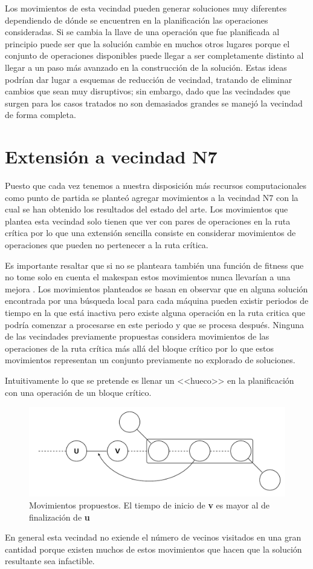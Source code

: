 Los movimientos de esta vecindad pueden generar soluciones muy diferentes dependiendo de dónde se encuentren en la planificación las operaciones consideradas. 
%
Si se cambia la llave de una operación que fue planificada al principio puede ser que la solución cambie en muchos otros lugares porque el conjunto de operaciones 
disponibles puede llegar a ser completamente distinto al llegar a un paso más avanzado en la construcción de la solución. 
%
Estas ideas podrían dar lugar a esquemas de reducción de vecindad, tratando de eliminar cambios que sean muy disruptivos;
%
sin embargo, dado que las vecindades que surgen para los casos tratados no son demasiados grandes se manejó la vecindad de forma completa.

\section{Extensión a vecindad N7}

Puesto que cada vez tenemos a nuestra disposición más recursos computacionales como punto de partida se planteó agregar movimientos a la vecindad N7 
con la cual se han obtenido los resultados del estado del arte.
%
Los movimientos que plantea esta vecindad solo tienen que ver con pares de operaciones en la ruta crítica por lo que una extensión sencilla consiste en 
considerar movimientos de operaciones que pueden no pertenecer a la ruta crítica. 

Es importante resaltar que si no se planteara también una función de fitness que no tome solo en cuenta el makespan estos movimientos nunca llevarían 
a una mejora \cite{blazewicz1996job}.
%
Los movimientos planteados se basan en observar que en alguna solución encontrada por una búsqueda local para cada máquina pueden existir periodos de tiempo en la 
que está inactiva pero existe alguna operación en la ruta critica que podría comenzar a procesarse en este periodo y que se procesa después. 
%
Ninguna de las vecindades previamente propuestas considera movimientos de las operaciones de la ruta crítica más allá del bloque crítico por lo que estos movimientos 
representan un conjunto previamente no explorado de soluciones.

Intuitivamente lo que se pretende es llenar un <<hueco>> en la planificación con una operación de un bloque crítico.

\begin{figure}[H]
\centering
\includegraphics[scale=.7]{Imagenes/N8.pdf}
    \caption{Movimientos propuestos. El tiempo de inicio de \textbf{v} es mayor al de finalización de \textbf{u}}
\end{figure}

En general esta vecindad no exiende el número de vecinos visitados en una gran cantidad porque existen muchos de estos movimientos que hacen que la solución 
resultante sea infactible. 
